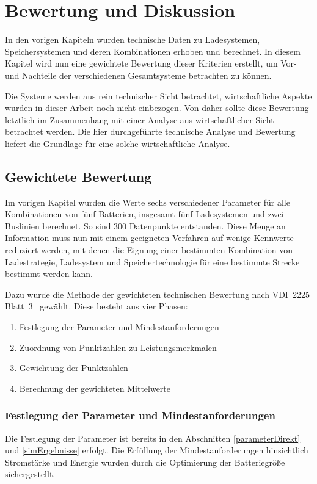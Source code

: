 \chapter{Bewertung und Diskussion} %
\label{chap5}
In den vorigen Kapiteln wurden technische Daten zu Ladesystemen, Speichersystemen und deren Kombinationen erhoben und berechnet. In diesem Kapitel wird nun eine gewichtete Bewertung dieser Kriterien erstellt, um Vor- und Nachteile der verschiedenen Gesamtsysteme betrachten zu können.

Die Systeme werden aus rein technischer Sicht betrachtet, wirtschaftliche Aspekte wurden in dieser Arbeit noch nicht einbezogen. Von daher sollte diese Bewertung letztlich im Zusammenhang mit einer Analyse aus wirtschaftlicher Sicht betrachtet werden. Die hier durchgeführte technische Analyse und Bewertung liefert die Grundlage für eine solche wirtschaftliche Analyse.

\section{Gewichtete Bewertung}
Im vorigen Kapitel wurden die Werte sechs verschiedener Parameter für alle Kombinationen von fünf Batterien, insgesamt fünf Ladesystemen und zwei Buslinien berechnet. So sind 300 Datenpunkte entstanden. Diese Menge an Information muss nun mit einem geeigneten Verfahren auf wenige Kennwerte reduziert werden, mit denen die Eignung einer bestimmten Kombination von Ladestrategie, Ladesystem und Speichertechnologie für eine bestimmte Strecke bestimmt werden kann.

Dazu wurde die Methode der gewichteten technischen Bewertung nach VDI~2225 Blatt~3~\cite{vdi:2225} gewählt. Diese besteht aus vier Phasen:
\begin{enumerate}
	\item Festlegung der Parameter und Mindestanforderungen
	\item Zuordnung von Punktzahlen zu Leistungsmerkmalen
	\item Gewichtung der Punktzahlen
	\item Berechnung der gewichteten Mittelwerte
\end{enumerate}

\subsection{Festlegung der Parameter und Mindestanforderungen}
Die Festlegung der Parameter ist bereits in den Abschnitten \ref{parameterDirekt} und \ref{simErgebnisse} erfolgt. Die Erfüllung der Mindestanforderungen hinsichtlich Stromstärke und Energie wurden durch die Optimierung der Batteriegröße sichergestellt.

